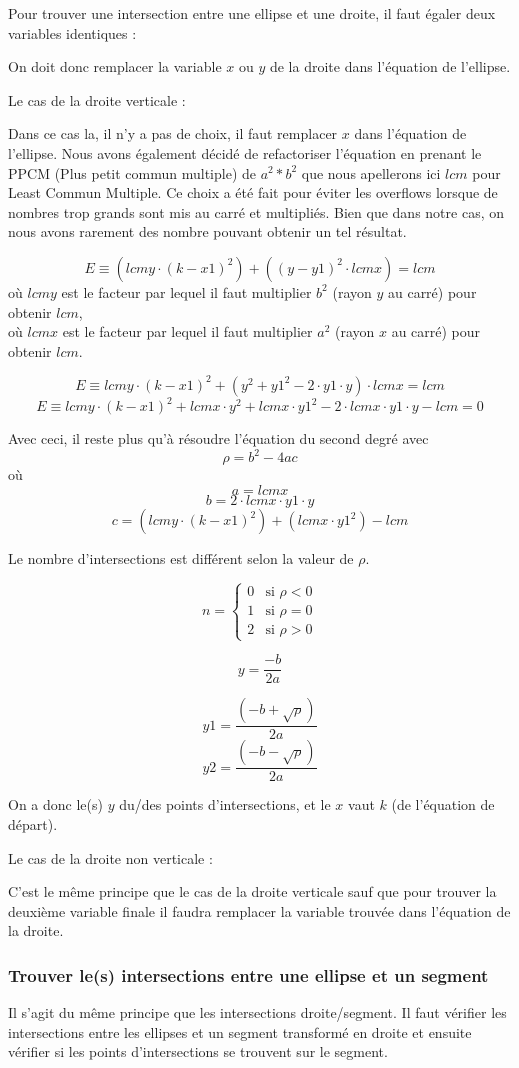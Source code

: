 \documentclass[]{article}
\begin{document}
Pour trouver une intersection entre une ellipse
et une droite, il faut égaler deux variables 
identiques :


On doit donc remplacer la variable $x$ ou $y$ de la droite dans
l'équation de l'ellipse.

Le cas de la droite verticale : 

Dans ce cas la, il n'y a pas de choix, il faut remplacer
$x$ dans l'équation de l'ellipse.
Nous avons également décidé de refactoriser l'équation en 
prenant le PPCM (Plus petit commun multiple) de $a^2 * b^2$ que
nous apellerons ici $lcm$ pour Least Commun Multiple.
Ce choix a été fait pour éviter les overflows lorsque 
de nombres trop grands sont mis au carré et multipliés.
Bien que dans notre cas, on nous avons rarement des nombre
pouvant obtenir un tel résultat.

$$ E \equiv (lcmy \cdot (k - x1)^2) + ((y - y1)^2 \cdot lcmx) = lcm $$  
où $lcmy$ est le facteur par lequel il faut multiplier
$b^2$ (rayon $y$ au carré) pour obtenir $lcm$, \\
où $lcmx$ est le facteur par lequel il faut multiplier
$a^2$ (rayon $x$ au carré) pour obtenir $lcm$.

$$ E \equiv lcmy \cdot (k-x1)^2 + (y^2 + y1^2 - 2 \cdot y1 \cdot y)
\cdot lcmx = lcm$$
$$ E \equiv lcmy \cdot (k-x1)^2 + lcmx \cdot y^2 + lcmx \cdot
y1^2 - 2 \cdot lcmx \cdot y1 \cdot y - lcm = 0 $$

Avec ceci, il reste plus qu'à résoudre l'équation du second degré 
avec 
$$ \rho = b^2 - 4ac$$
où $$ a = lcmx $$
$$ b = 2 \cdot lcmx \cdot y1 \cdot y $$
$$ c = (lcmy \cdot (k-x1)^2) + (lcmx \cdot y1^2) - lcm $$



Le nombre d'intersections est différent selon la valeur de $\rho$.

\[
	n =
	\begin{cases}
		0 & \text{si } \rho < 0 \\
		1 & \text{si } \rho = 0 \\
		2 & \text{si } \rho > 0  
	\end{cases}
\]

$$ y = \frac {-b}{2a} $$

$$ y1 = \frac{(-b + \sqrt{\rho})}{2a} $$
$$ y2 = \frac{(-b - \sqrt{\rho})}{2a} $$

On a donc le(s) $y$ du/des points d'intersections, et le $x$
vaut $k$ (de l'équation de départ).



Le cas de la droite non verticale : 


C'est le même principe que le cas de la droite verticale sauf
que pour trouver la deuxième variable finale il faudra
remplacer la variable trouvée dans l'équation de la droite.

\subsubsection{Trouver le(s) intersections entre une ellipse et un segment}

Il s'agit du même principe que les intersections droite/segment.
Il faut vérifier les intersections entre les ellipses et un segment
transformé en droite et ensuite vérifier si les points d'intersections
se trouvent sur le segment.
\end{document}
